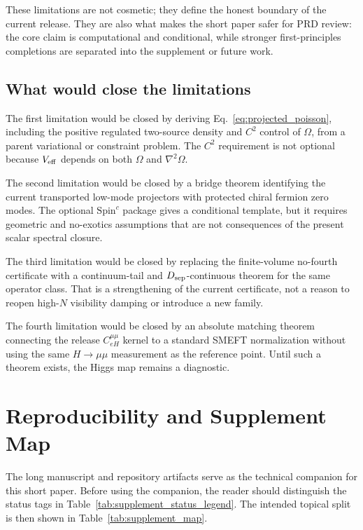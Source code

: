 \documentclass[aps,prd,onecolumn,notitlepage,nofootinbib,superscriptaddress,11pt,floatfix]{revtex4-2}
\begin{document}
These limitations are not cosmetic; they define the honest boundary of the current release.
They are also what makes the short paper safer for PRD review: the core claim is computational and conditional, while stronger first-principles completions are separated into the supplement or future work.

\subsection{What would close the limitations}

The first limitation would be closed by deriving Eq.~\eqref{eq:projected_poisson}, including the positive regulated two-source density and \(C^2\) control of \(\Omega\), from a parent variational or constraint problem.
The \(C^2\) requirement is not optional because \(V_{\rm eff}\) depends on both \(\Omega\) and \(\nabla^2\Omega\).

The second limitation would be closed by a bridge theorem identifying the current transported low-mode projectors with protected chiral fermion zero modes.
The optional \(\mathrm{Spin}^c\) package gives a conditional template, but it requires geometric and no-exotics assumptions that are not consequences of the present scalar spectral closure.

The third limitation would be closed by replacing the finite-volume no-fourth certificate with a continuum-tail and \(D_{\rm sep}\)-continuous theorem for the same operator class.
That is a strengthening of the current certificate, not a reason to reopen high-\(N\) visibility damping or introduce a new family.

The fourth limitation would be closed by an absolute matching theorem connecting the release \(C_{eH}^{\mu\mu}\) kernel to a standard SMEFT normalization without using the same \(H\to\mu\mu\) measurement as the reference point.
Until such a theorem exists, the Higgs map remains a diagnostic.

\section{Reproducibility and Supplement Map}
\label{sec:repro}

The long manuscript and repository artifacts serve as the technical companion for this short paper.
Before using the companion, the reader should distinguish the status tags in Table~\ref{tab:supplement_status_legend}.
The intended topical split is then shown in Table~\ref{tab:supplement_map}.
\end{document}
